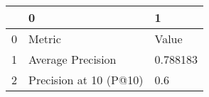 \begin{tabular}{lll}
\toprule
{} &                       0 &         1 \\
\midrule
0 &                  Metric &     Value \\
1 &       Average Precision &  0.788183 \\
2 &  Precision at 10 (P@10) &       0.6 \\
\bottomrule
\end{tabular}
